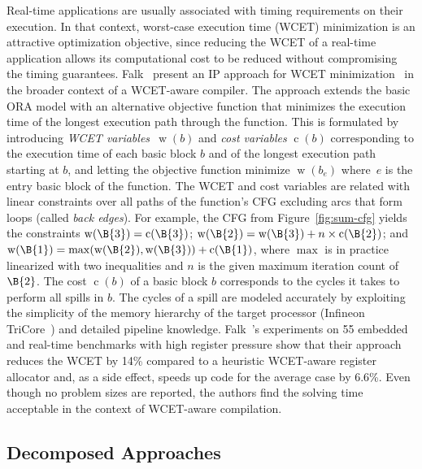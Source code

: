 \documentclass[acmsmall,authorversion,nonacm]{acmart}
\newcommand{\noMathVar}[2]{\operatorname{#1}(#2)}
\newcommand{\var}[2]{$\noMathVar{#1}{#2}$}
\begin{document}
Real-time applications are usually associated with timing requirements
on their execution.
In that context, worst-case execution time (WCET) minimization is an
attractive optimization objective, since reducing the WCET of a
real-time application allows its computational cost to be reduced
without compromising the timing guarantees.
Falk~\etal{} present an IP approach for WCET
minimization~\cite{Falk2011} in the broader context of a WCET-aware
compiler.
The approach extends the basic ORA model with an alternative objective
function that minimizes the execution time of the longest execution
path through the function.
This is formulated by introducing \emph{WCET variables}~\var{w}{b} and
\emph{cost variables} \var{c}{b} corresponding to the execution time
of each basic block $b$ and of the longest execution path starting at
$b$, and letting the objective function minimize \var{w}{b_e}
where~$e$ is the entry basic block of the function.
The WCET and cost variables are related with linear constraints over
all paths of the function's CFG excluding arcs that form loops (called
\emph{back edges}).
For example, the CFG from Figure~\ref{fig:sum-cfg} yields the
constraints $\noMathVar{w}{\B{3}} = \noMathVar{c}{\B{3}}$;
$\noMathVar{w}{\B{2}} = \noMathVar{w}{\B{3}} + n \times
\noMathVar{c}{\B{2}}$; and $\noMathVar{w}{\B{1}} =
\max(\noMathVar{w}{\B{2}},\noMathVar{w}{\B{3}}) +
\noMathVar{c}{\B{1}}$, where $\max$ is in practice linearized with two
inequalities and $n$ is the given maximum iteration count of $\B{2}$.
The cost \var{c}{b} of a basic block $b$ corresponds to the cycles it
takes to perform all spills in $b$.
The cycles of a spill are modeled accurately by exploiting the
simplicity of the memory hierarchy of the target processor (Infineon
TriCore~\cite{TriCore}) and detailed pipeline knowledge.
Falk~\etal{}'s experiments on 55 embedded and real-time benchmarks
with high register pressure show that their approach reduces the WCET
by 14\% compared to a heuristic WCET-aware register allocator and, as
a side effect, speeds up code for the average case by 6.6\%.
Even though no problem sizes are reported, the authors find the
solving time acceptable in the context of WCET-aware compilation.

\subsection{Decomposed Approaches}
\label{sec:decomposed-approaches}
\end{document}
